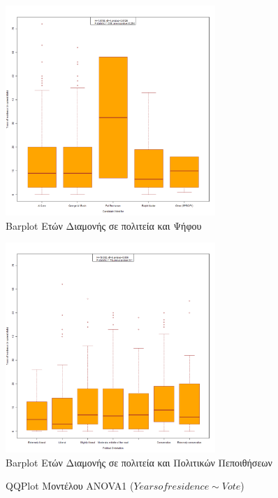 \documentclass[10pt, letterpaper]{article}
\begin{document}
\begin{center}
\begin{figure}[h]
            \end{figure}
            \newpage
            \begin{figure}[h]
                \caption{Barplot Ετών Διαμονής σε πολιτεία και Ψήφου}
                \label{yearsvoteplot}
                \centering
                \includegraphics[width=300px, keepaspectratio]{resources/YearsOfResidence_Vote_Plot.png}
            \end{figure}
            \newpage
            \begin{figure}[h]
                \caption{Barplot Ετών Διαμονής σε πολιτεία και Πολιτικών Πεποιθήσεων}
                \label{yearspoliticalplot}
                \centering
                \includegraphics[width=300px, keepaspectratio]{resources/YearsOfResidence_PoliticalOrientation_Plot.png}
            \end{figure}
            \newpage
            \begin{figure}[h]
                \caption{QQPlot Μοντέλου ANOVA1 ($Yearsofresidence \sim Vote$)}
                \label{anova1plot}

\end{figure}
\end{center}
\end{document}

